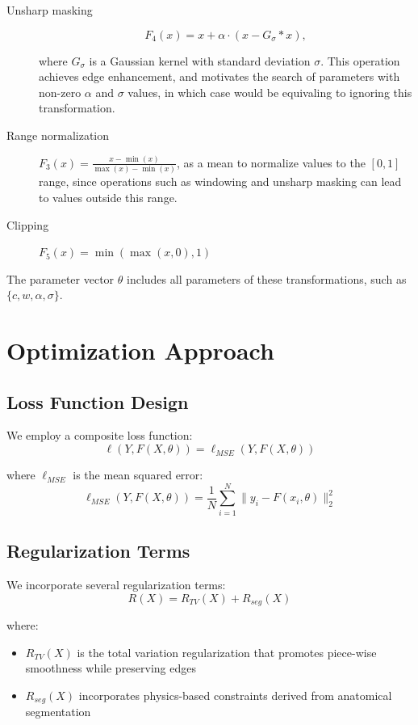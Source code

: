 \documentclass[nomenclature, english, bibtex]{kththesis}
\numberwithin{listing}{chapter}
\begin{document}
\begin{description}
\item[Unsharp masking]
\begin{equation}
    F_4(x) = x + \alpha \cdot (x - G_\sigma * x),
\end{equation}

where $G_\sigma$ is a Gaussian kernel with standard deviation $\sigma$.
This operation achieves edge enhancement, and motivates the search of parameters with non-zero $\alpha$ and $\sigma$ values,
in which case would be equivaling to ignoring this transformation.

\item[Range normalization] $F_3(x) = \frac{x - \min(x)}{\max(x) - \min(x)}$, as a mean to normalize values to the $[0,1]$
range, since operations such as windowing and unsharp masking can lead to values outside this range.

\item[Clipping] $F_5(x) = \min(\max(x, 0), 1)$
\end{description}

The parameter vector $\theta$ includes all parameters of these transformations, such as $\{c, w, \alpha, \sigma\}$.

\section{Optimization Approach}
\subsection{Loss Function Design}
We employ a composite loss function:
\begin{equation}
\ell(Y, F(X, \theta)) = \ell_{MSE}(Y, F(X, \theta))
\end{equation}

where $\ell_{MSE}$ is the mean squared error:
\begin{equation}
\ell_{MSE}(Y, F(X, \theta)) = \frac{1}{N} \sum_{i=1}^N \|y_i - F(x_i, \theta)\|_2^2
\end{equation}

\subsection{Regularization Terms}
We incorporate several regularization terms:
\begin{equation}
R(X) = R_{TV}(X) + R_{seg}(X)
\end{equation}

where:
\begin{itemize}
    \item $R_{TV}(X)$ is the total variation regularization that promotes piece-wise smoothness while preserving edges
    \item $R_{seg}(X)$ incorporates physics-based constraints derived from anatomical segmentation
\end{itemize}
\end{document}
